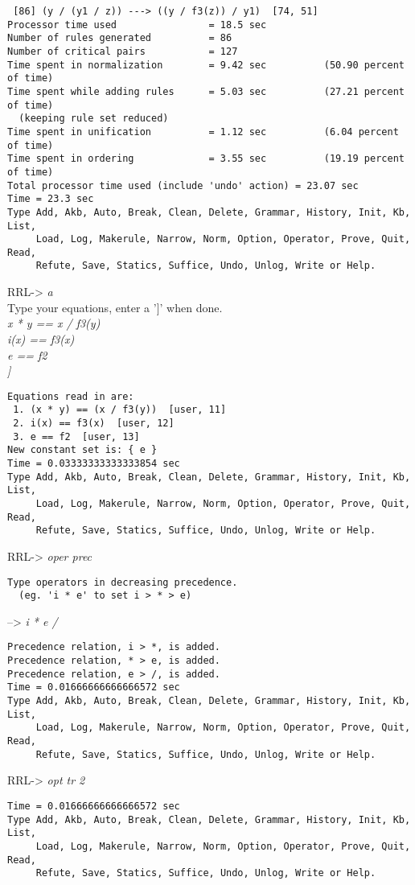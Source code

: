 \begin{verbatim}
 [86] (y / (y1 / z)) ---> ((y / f3(z)) / y1)  [74, 51]
Processor time used                = 18.5 sec
Number of rules generated          = 86
Number of critical pairs           = 127
Time spent in normalization        = 9.42 sec          (50.90 percent of time)
Time spent while adding rules      = 5.03 sec          (27.21 percent of time)
  (keeping rule set reduced)
Time spent in unification          = 1.12 sec          (6.04 percent of time)
Time spent in ordering             = 3.55 sec          (19.19 percent of time)
Total processor time used (include 'undo' action) = 23.07 sec
Time = 23.3 sec
Type Add, Akb, Auto, Break, Clean, Delete, Grammar, History, Init, Kb, List,
     Load, Log, Makerule, Narrow, Norm, Option, Operator, Prove, Quit, Read,
     Refute, Save, Statics, Suffice, Undo, Unlog, Write or Help.
\end{verbatim}
RRL-> {\em a}\\
Type your equations, enter a ']' when done.\\
{\em x * y == x / f3(y)\\
i(x) == f3(x)\\
e == f2\\
]}
\begin{verbatim}
Equations read in are:
 1. (x * y) == (x / f3(y))  [user, 11]
 2. i(x) == f3(x)  [user, 12]
 3. e == f2  [user, 13]
New constant set is: { e }
Time = 0.03333333333333854 sec
Type Add, Akb, Auto, Break, Clean, Delete, Grammar, History, Init, Kb, List,
     Load, Log, Makerule, Narrow, Norm, Option, Operator, Prove, Quit, Read,
     Refute, Save, Statics, Suffice, Undo, Unlog, Write or Help.
\end{verbatim}
RRL-> {\em oper prec}
\begin{verbatim}
Type operators in decreasing precedence.
  (eg. 'i * e' to set i > * > e) 
\end{verbatim}
--> {\em i * e /}
\begin{verbatim}
Precedence relation, i > *, is added.
Precedence relation, * > e, is added.
Precedence relation, e > /, is added.
Time = 0.01666666666666572 sec
Type Add, Akb, Auto, Break, Clean, Delete, Grammar, History, Init, Kb, List,
     Load, Log, Makerule, Narrow, Norm, Option, Operator, Prove, Quit, Read,
     Refute, Save, Statics, Suffice, Undo, Unlog, Write or Help.
\end{verbatim}
RRL-> {\em opt tr 2}
\begin{verbatim}
Time = 0.01666666666666572 sec
Type Add, Akb, Auto, Break, Clean, Delete, Grammar, History, Init, Kb, List,
     Load, Log, Makerule, Narrow, Norm, Option, Operator, Prove, Quit, Read,
     Refute, Save, Statics, Suffice, Undo, Unlog, Write or Help.
\end{verbatim}
